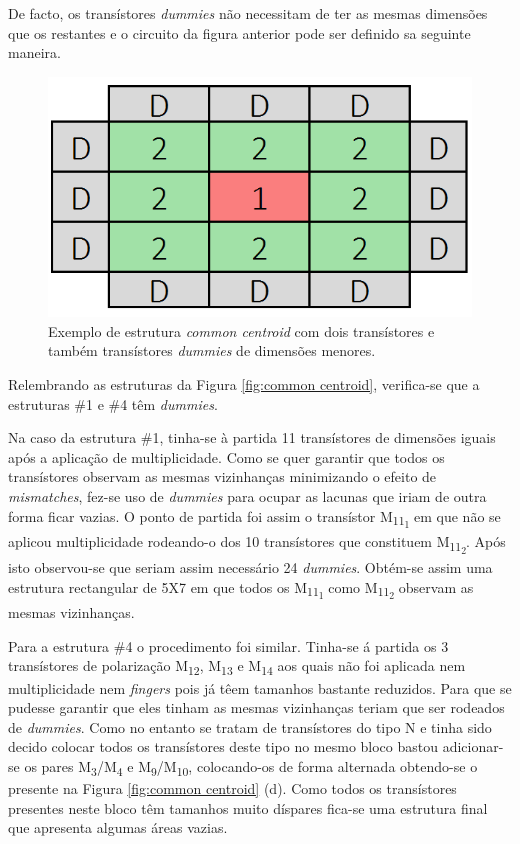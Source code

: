 \documentclass[11pt]{article}
\numberwithin{equation}{section}
\begin{document}
De facto, os transístores \textit{dummies} não necessitam de ter as mesmas dimensões que os restantes e o circuito da figura anterior pode ser definido sa seguinte maneira.

\begin{figure}[H]
	\centering
	\includegraphics[keepaspectratio=true, scale=0.35]{teoricas/dummy3}
	\vspace{-0.5em}
	\caption{Exemplo de estrutura \textit{common centroid} com dois transístores e também transístores \textit{dummies} de dimensões menores.}
	\vspace{-0.8em}
\end{figure}

Relembrando as estruturas da Figura \ref{fig:common centroid}, verifica-se que a estruturas \#1 e \#4 têm \textit{dummies}.

Na caso da estrutura \#1, tinha-se à partida 11 transístores de dimensões iguais após a aplicação de multiplicidade. Como se quer garantir que todos os transístores observam as mesmas vizinhanças minimizando o efeito de \textit{mismatches}, fez-se uso de \textit{dummies} para ocupar as lacunas que iriam de outra forma ficar vazias. O ponto de partida foi assim o transístor M\textsubscript{11\textsubscript{1}} em que não se aplicou multiplicidade rodeando-o dos 10 transístores que constituem M\textsubscript{11\textsubscript{2}}. Após isto observou-se que seriam assim necessário 24 \textit{dummies}. Obtém-se assim uma estrutura rectangular de 5X7 em que todos os M\textsubscript{11\textsubscript{1}} como M\textsubscript{11\textsubscript{2}} observam as mesmas vizinhanças.
		
Para a estrutura \#4 o procedimento foi similar. Tinha-se á partida os 3 transístores de polarização M\textsubscript{12}, M\textsubscript{13} e M\textsubscript{14} aos quais não foi aplicada nem multiplicidade nem \textit{fingers} pois já têem tamanhos bastante reduzidos. Para que se pudesse garantir que eles tinham as mesmas vizinhanças teriam que ser rodeados de \textit{dummies}. Como no entanto se tratam de transístores do tipo N e tinha sido decido colocar todos os transístores deste tipo no mesmo bloco bastou adicionar-se os pares  M\textsubscript{3}/M\textsubscript{4} e  M\textsubscript{9}/M\textsubscript{10}, colocando-os de forma alternada obtendo-se o presente na Figura \ref{fig:common centroid} (d). Como todos os transístores presentes neste bloco têm tamanhos muito díspares fica-se uma estrutura final que apresenta algumas áreas vazias.
\end{document}
